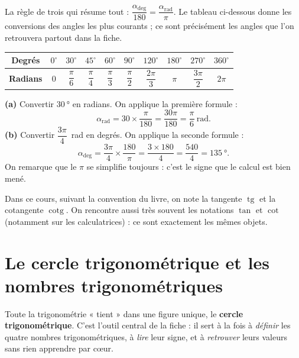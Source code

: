 \documentclass[11pt,a4paper]{article}
\DeclareMathOperator{\tg}{tg}        %
\DeclareMathOperator{\cotg}{cotg}    %
\newcommand{\degr}{^{\circ}}
\begin{document}
La règle de trois qui résume tout : $\dfrac{\alpha_{\text{deg}}}{180} = \dfrac{\alpha_{\text{rad}}}{\pi}$.
Le tableau ci-dessous donne les conversions des angles les plus courants ; ce sont précisément les
angles que l'on retrouvera partout dans la fiche.

\begin{center}
\renewcommand{\arraystretch}{1.4}
\begin{tabular}{|c|c|c|c|c|c|c|c|c|c|}
\hline
\rowcolor{primary!12}
\textbf{Degrés} & $0\degr$ & $30\degr$ & $45\degr$ & $60\degr$ & $90\degr$ & $120\degr$ & $180\degr$ & $270\degr$ & $360\degr$\\
\hline
\textbf{Radians} & $0$ & $\dfrac{\pi}{6}$ & $\dfrac{\pi}{4}$ & $\dfrac{\pi}{3}$ & $\dfrac{\pi}{2}$ & $\dfrac{2\pi}{3}$ & $\pi$ & $\dfrac{3\pi}{2}$ & $2\pi$\\[4pt]
\hline
\end{tabular}
\end{center}

\begin{exemple}
\textbf{(a)} Convertir $\SI{30}{\degree}$ en radians. On applique la première formule :
\[
\alpha_{\text{rad}} = 30\times\frac{\pi}{180} = \frac{30\pi}{180} = \frac{\pi}{6}\ \text{rad}.
\]
\textbf{(b)} Convertir $\dfrac{3\pi}{4}$~rad en degrés. On applique la seconde formule :
\[
\alpha_{\text{deg}} = \frac{3\pi}{4}\times\frac{180}{\pi}
= \frac{3\times 180}{4} = \frac{540}{4} = \SI{135}{\degree}.
\]
On remarque que le $\pi$ se simplifie toujours : c'est le signe que le calcul est bien mené.
\end{exemple}

\begin{remarque}
Dans ce cours, suivant la convention du livre, on note la tangente $\tg$ et la cotangente $\cotg$.
On rencontre aussi très souvent les notations $\tan$ et $\cot$ (notamment sur les calculatrices) :
ce sont exactement les mêmes objets.
\end{remarque}

\section{Le cercle trigonométrique et les nombres trigonométriques}
Toute la trigonométrie « tient » dans une figure unique, le \textbf{cercle trigonométrique}.
C'est l'outil central de la fiche : il sert à la fois à \emph{définir} les quatre nombres
trigonométriques, à \emph{lire} leur signe, et à \emph{retrouver} leurs valeurs sans rien
apprendre par cœur.
\end{document}

